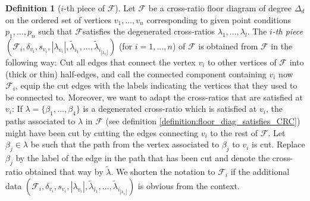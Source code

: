 \documentclass[11pt,reqno,a4]{amsart}
\theoremstyle{dotless}
\theoremstyle{definition}
\newtheorem{definition}[corollary]{Definition}
\begin{document}
\begin{definition}[$i$-th piece of $\mathcal{F}$]\label{definition:piece_of_floor_diag}
Let $\mathcal{F}$ be a cross-ratio floor diagram of degree $\Delta_d$ on the ordered set of vertices $v_1,\dots,v_n$ corresponding to given point conditions $p_1,\dots,p_n$ such that $\mathcal{F} $satisfies the degenerated cross-ratios $\lambda_1,\dots,\lambda_l$. The \textit{ $i$-th piece} $\left(\mathcal{F}_i,\delta_{v_i},s_{v_i},|\lambda_{v_i}|,\tilde{\lambda}_{i_1},\dots,\tilde{\lambda}_{i_{|\lambda_{v_i}|}}\right)$ (for $i=1,\dots,n$) of $\mathcal{F}$ is obtained from $\mathcal{F}$ in the following way: Cut all edges that connect the vertex $v_i$ to other vertices of $\mathcal{F}$ into (thick or thin) half-edges, and call the connected component containing $v_i$ now $\mathcal{F}_i$, equip the cut edges with the labels indicating the vertices that they used to be connected to.
Moreover, we want to adapt the cross-ratios that are satisfied at $v_i$: If $\lambda=\lbrace \beta_1,\dots,\beta_4 \rbrace$ is a degenerated cross-ratio which is satisfied at $v_i$, the paths associated to $\lambda$ in $\mathcal{F}$ (see definition \ref{definition:floor_diag_satisfies_CRC}) might have been cut by cutting the edges connecting $v_i$ to the rest of $\mathcal{F}$. Let $\beta_j\in\lambda$ be such that the path from the vertex associated to $\beta_j$ to $v_i$ is cut. Replace $\beta_j$ by the label of the edge in the path that has been cut and denote the cross-ratio obtained that way by $\tilde{\lambda}$. We shorten the notation to $\mathcal{F}_i$ if the additional data $\left(\mathcal{F}_i,\delta_{v_i},s_{v_i},|\lambda_{v_i}|,\tilde{\lambda}_{i_1},\dots,\tilde{\lambda}_{i_{|\lambda_{v_i}|}}\right)$ is obvious from the context.
\end{definition}
\end{document}
